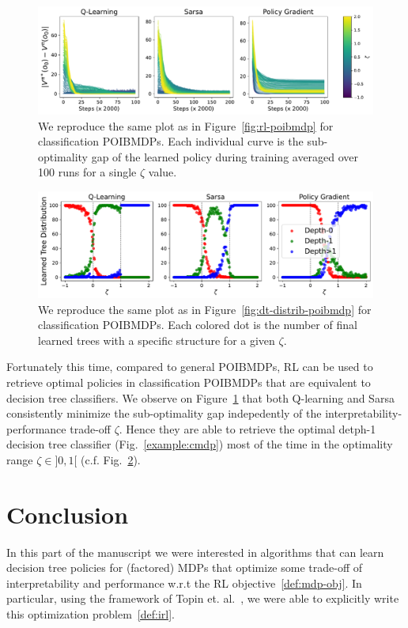 \begin{figure}
    \centering
    \includegraphics[width=1\textwidth]{images/images_part1/learning_curves_classif.pdf}
    \caption{We reproduce the same plot as in Figure~\ref{fig:rl-poibmdp} for classification POIBMDPs. Each individual curve is the sub-optimality gap of the learned policy during training averaged over 100 runs for a single $\zeta$ value.}\label{fig:rl-classif-poibmdp}
\end{figure}

\begin{figure}
    \centering
    \includegraphics[width=1\textwidth]{images/images_part1/tree_distributions_classif.pdf}
    \caption{We reproduce the same plot as in Figure~\ref{fig:dt-distrib-poibmdp} for classification POIBMDPs. Each colored dot is the number of final learned trees with a specific structure for a given $\zeta$.}\label{fig:tree-distrib-classif-poibmdp}
\end{figure}

Fortunately this time, compared to general POIBMDPs, RL can be used to retrieve optimal policies in classification POIBMDPs that are equivalent to decision tree classifiers.
We observe on Figure~\ref{fig:rl-classif-poibmdp} that both Q-learning and Sarsa consistently minimize the sub-optimality gap indepedently of the interpretability-performance trade-off $\zeta$. 
Hence they are able to retrieve the optimal detph-1 decision tree classifier (Fig.~\ref{example:cmdp}) most of the time in the optimality range $\zeta\in ]0, 1[$ (c.f. Fig.~\ref{fig:tree-distrib-classif-poibmdp}).


\section{Conclusion}
In this part of the manuscript we were interested in algorithms that can learn decision tree policies for (factored) MDPs that optimize some trade-off of interpretability and performance w.r.t the RL objective~\ref{def:mdp-obj}.
In particular, using the framework of Topin et. al.~\cite{topin2021iterative}, we were able to explicitly write this optimization problem~\ref{def:irl}.

